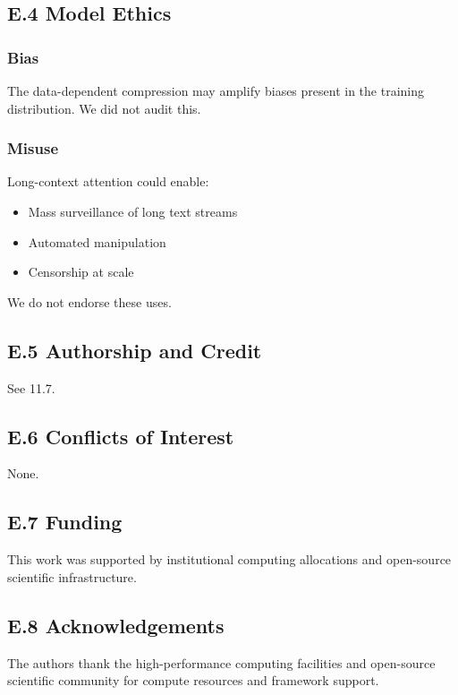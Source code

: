 \subsection{E.4 Model Ethics}

\subsubsection{Bias}

The data-dependent compression may amplify biases present in the training 
distribution. We did not audit this.

\subsubsection{Misuse}

Long-context attention could enable:

\begin{itemize}
\item Mass surveillance of long text streams
\item Automated manipulation
\item Censorship at scale

\end{itemize}
We do not endorse these uses.

\subsection{E.5 Authorship and Credit}

See  11.7.

\subsection{E.6 Conflicts of Interest}

None.

\subsection{E.7 Funding}

This work was supported by institutional computing allocations and open-source scientific infrastructure.

\subsection{E.8 Acknowledgements}

The authors thank the high-performance computing facilities and open-source scientific community for compute resources and framework support.

